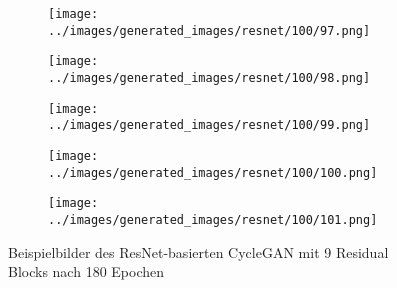 \begin{figure}[H]
\begin{subfigure}[b]{0.1\textwidth}
\end{subfigure}
\hspace{1em}%
\begin{subfigure}[b]{0.1\textwidth}
\centering
\texttt{[image: ../images/generated\_images/resnet/100/97.png]}
\end{subfigure}
\hspace{1em}%
\begin{subfigure}[b]{0.1\textwidth}
\centering
\texttt{[image: ../images/generated\_images/resnet/100/98.png]}
\end{subfigure}
\hspace{1em}%
\begin{subfigure}[b]{0.1\textwidth}
\centering
\texttt{[image: ../images/generated\_images/resnet/100/99.png]}
\end{subfigure}
\hspace{1em}%
\begin{subfigure}[b]{0.1\textwidth}
\centering
\texttt{[image: ../images/generated\_images/resnet/100/100.png]}
\end{subfigure}
\hspace{1em}%
\begin{subfigure}[b]{0.1\textwidth}
\centering
\texttt{[image: ../images/generated\_images/resnet/100/101.png]}
\end{subfigure}
     \caption{Beispielbilder des ResNet-basierten \ac{CycleGAN} mit 9 Residual Blocks nach 180 Epochen}
     \label{fig:resnet-imgs}
\end{figure}

